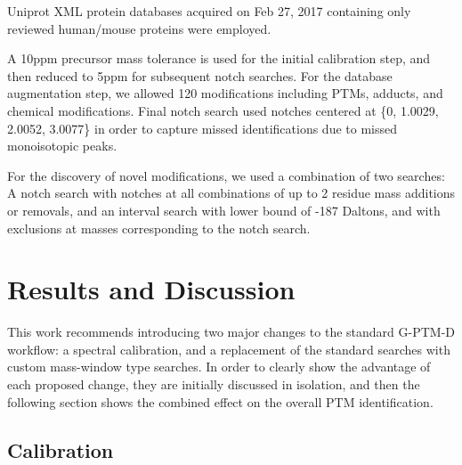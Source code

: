 \documentclass[journal=jprobs,manuscript=article]{achemso}
\begin{document}
Uniprot XML protein databases acquired on Feb 27, 2017 containing only reviewed human/mouse proteins were employed. 

A 10ppm precursor mass tolerance is used for the initial calibration step, and then reduced to 5ppm for subsequent notch searches.
For the database augmentation step, we allowed 120 modifications including PTMs, adducts, and chemical modifications.
Final notch search used notches centered at \{0, 1.0029, 2.0052, 3.0077\} in order to capture missed identifications due to missed monoisotopic peaks.

For the discovery of novel modifications, we used a combination of two searches: A notch search with notches at all combinations of up to 2 residue mass additions or removals, and an interval search with lower bound of -187 Daltons, and with exclusions at masses corresponding to the notch search.

\section{Results and Discussion}

This work recommends introducing two major changes to the standard G-PTM-D workflow: a spectral calibration, and a replacement of the standard searches with custom mass-window type searches.
In order to clearly show the advantage of each proposed change, they are initially discussed in isolation, and then the following section shows the combined effect on the overall PTM identification.


\subsection{Calibration}
\end{document}
